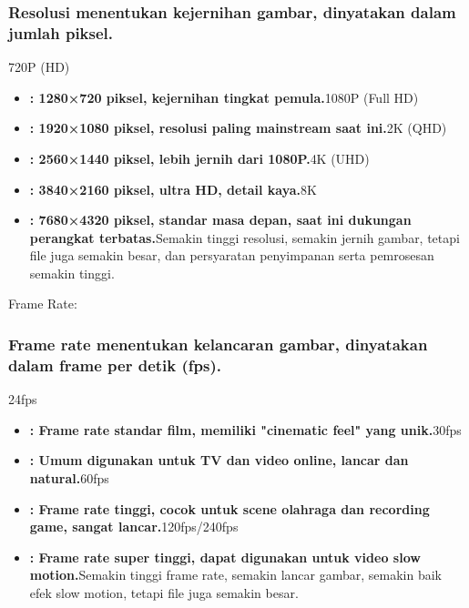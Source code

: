 


\subsubsection*{Resolusi menentukan kejernihan gambar, dinyatakan dalam jumlah piksel.}

720P (HD)

\begin{itemize}
  \item \textbf{: 1280×720 piksel, kejernihan tingkat pemula.}1080P (Full HD)
  \item \textbf{: 1920×1080 piksel, resolusi paling mainstream saat ini.}2K (QHD)
  \item \textbf{: 2560×1440 piksel, lebih jernih dari 1080P.}4K (UHD)
  \item \textbf{: 3840×2160 piksel, ultra HD, detail kaya.}8K
  \item \textbf{: 7680×4320 piksel, standar masa depan, saat ini dukungan perangkat terbatas.}Semakin tinggi resolusi, semakin jernih gambar, tetapi file juga semakin besar, dan persyaratan penyimpanan serta pemrosesan semakin tinggi.
\end{itemize}

Frame Rate:

\subsubsection*{Frame rate menentukan kelancaran gambar, dinyatakan dalam frame per detik (fps).}

24fps

\begin{itemize}
  \item \textbf{: Frame rate standar film, memiliki "cinematic feel" yang unik.}30fps
  \item \textbf{: Umum digunakan untuk TV dan video online, lancar dan natural.}60fps
  \item \textbf{: Frame rate tinggi, cocok untuk scene olahraga dan recording game, sangat lancar.}120fps/240fps
  \item \textbf{: Frame rate super tinggi, dapat digunakan untuk video slow motion.}Semakin tinggi frame rate, semakin lancar gambar, semakin baik efek slow motion, tetapi file juga semakin besar.
\end{itemize}

